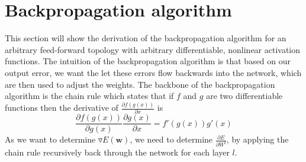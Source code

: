 \section{Backpropagation algorithm}
This section will show the derivation of the backpropagation algorithm for an
arbitrary feed-forward topology with arbitrary differentiable, nonlinear
activation functions. The intuition of the backpropagation algorithm is that
based on our output error, we want the let these errors flow backwards into the
network, which are then used to adjust the weights. The backbone of the
backpropagation algorithm is the chain rule which states that if $f$ and $g$ are
two differentiable functions then the derivative of $\frac{\partial
	f(g(x))}{\partial x}$ is
\begin{equation}
\frac{\partial f(g(x))}{\partial g(x)} \frac{\partial g(x)}{\partial x} = 
f'(g(x))g'(x)
\end{equation}
As we want to determine $\triangledown E(\textbf{w})$, we need to determine
$\frac{\partial E}{\partial W^l}$, by applying the chain rule recursively back
through the network for each layer $l$. 
